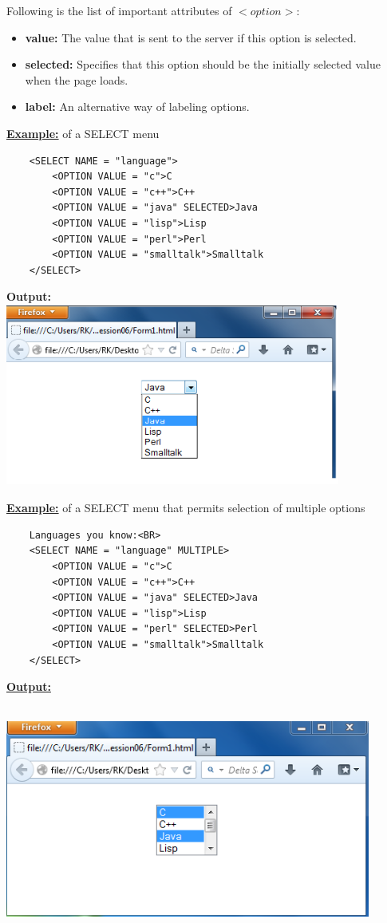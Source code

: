 \documentclass[11pt,a4paper]{article}
\begin{document}
Following is the list of important attributes of $<option>$:
\begin{itemize}
\item \textbf{value:} The value that is sent to the server if this option is selected.
\item \textbf{selected:} Specifies that this option should be the initially selected value when the page loads.
\item \textbf{label:} An alternative way of labeling options.
\end{itemize}
\underline{\textbf{Example:}} of a SELECT menu\\
\begin{verbatim}
    <SELECT NAME = "language">
        <OPTION VALUE = "c">C
        <OPTION VALUE = "c++">C++
        <OPTION VALUE = "java" SELECTED>Java
        <OPTION VALUE = "lisp">Lisp
        <OPTION VALUE = "perl">Perl
        <OPTION VALUE = "smalltalk">Smalltalk
    </SELECT>
\end{verbatim}
\textbf{Output:}\\
\includegraphics[height = 60mm, width = 110mm]{Form9.png}

\underline{\textbf{Example:}} of a SELECT menu that permits selection of multiple options\\
\begin{verbatim}
    Languages you know:<BR>
    <SELECT NAME = "language" MULTIPLE>
        <OPTION VALUE = "c">C
        <OPTION VALUE = "c++">C++
        <OPTION VALUE = "java" SELECTED>Java
        <OPTION VALUE = "lisp">Lisp
        <OPTION VALUE = "perl" SELECTED>Perl
        <OPTION VALUE = "smalltalk">Smalltalk
    </SELECT>
\end{verbatim}


\underline{\textbf{Output:}}

\includegraphics[height = 75mm, width = 120mm]{Form10.png}
\end{document}
